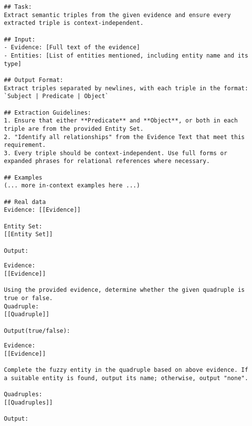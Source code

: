 \begin{lstlisting}[caption=Evidence Graph Construction Prompt, label={lst:evidence_graph}]
## Task:  
Extract semantic triples from the given evidence and ensure every extracted triple is context-independent.  

## Input:  
- Evidence: [Full text of the evidence]  
- Entities: [List of entities mentioned, including entity name and its type]  

## Output Format:  
Extract triples separated by newlines, with each triple in the format:  
`Subject | Predicate | Object`  

## Extraction Guidelines:  
1. Ensure that either **Predicate** and **Object**, or both in each triple are from the provided Entity Set. 
2. "Identify all relationships" from the Evidence Text that meet this requirement.  
3. Every triple should be context-independent. Use full forms or expanded phrases for relational references where necessary. 

## Examples
(... more in-context examples here ...)

## Real data
Evidence: [[Evidence]]

Entity Set: 
[[Entity Set]]

Output:

\end{lstlisting}
\begin{lstlisting}[caption=Graph Match Prompt, label={lst:graph_match_prompt}]
Evidence:
[[Evidence]]  

Using the provided evidence, determine whether the given quadruple is true or false.  
Quadruple:
[[Quadruple]]  

Output(true/false): 
\end{lstlisting}
\begin{lstlisting}[caption=Graph Completion Prompt, label={lst:graph_completion_prompt}]
Evidence:
[[Evidence]]

Complete the fuzzy entity in the quadruple based on above evidence. If a suitable entity is found, output its name; otherwise, output "none".

Quadruples:
[[Quadruples]]

Output:
\end{lstlisting}




